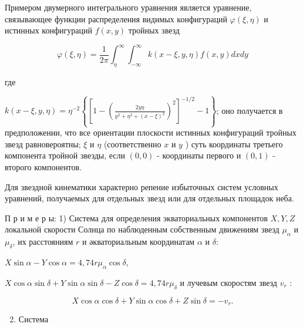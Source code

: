 \documentclass[10pt]{article}
\begin{document}
Примером двумерного интегрального уравнения является уравнение, связывающее функции распределения видимых конфигураций $\varphi(\xi, \eta)$ и истинных конфигураций $f(x, y)$ тройных звезд



\[

\varphi(\xi, \eta)=\frac{1}{2 \pi} \int_{\eta}^{\infty} \int_{-\infty}^{\infty} k(x-\xi, y, \eta) f(x, y) d x d y

\]



где



$k(x-\xi, y, \eta)=\eta^{-2}\left\{\left[1-\left(\frac{2 y \eta}{y^{2}+\eta^{2}+(x-\xi)^{2}}\right)^{2}\right]^{-1 / 2}-1\right\}$; оно получается в предположении, что все ориентации плоскости истинных конфигураций тройных звезд равновероятны; $\xi$ и $\eta$ (соответственно $x$ и $y$ ) суть координаты третьего компонента тройной звезды, если $(0,0)$ - координаты первого и $(0,1)$ - второго компонентов.



Для звездной кинематики характерно репение избыточных систем условных уравнений, получаемых для отдельных звезд или для отдельных площадок неба.



П р и м е р ы: 1) Система для определения экваториальных компонентов $X, Y, Z$ локальной скорости Солнца по наблюденным собственным движениям звезд $\mu_{\alpha}$ и $\mu_{\delta}$, их расстояниям $r$ и әкваториальным координатам $\alpha$ и $\delta:$



$X \sin \alpha-Y \cos \alpha=4,74 r \mu_{\alpha} \cos \delta$,



$X \cos \alpha \sin \delta+Y \sin \alpha \sin \delta-Z \cos \delta=4,74 r \mu_{\delta}$ и лучевым скоростям звезд $v_{r}$ :



\[

X \cos \alpha \cos \delta+Y \sin \alpha \cos \delta+Z \sin \delta=-v_{r} .

\]



\begin{enumerate}

  \setcounter{enumi}{1}

  \item Система

\end{enumerate}
\end{document}
